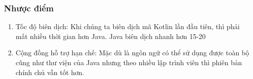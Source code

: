     \subsubsection{Nhược điểm}
        \begin{enumerate}
            \item Tốc độ biên dịch: Khi chúng ta biên dịch mã Kotlin lần đầu tiên, thì phải mất nhiều thời gian hơn Java. Java biên dịch nhanh hơn 15-20%
            \item Cộng đồng hỗ trợ hạn chế: Mặc dù là ngôn ngữ có thể sử dụng được toàn bộ cũng như thư viện của Java nhưng theo nhiều lập trình viên thì phiên bản chính chủ vẫn tốt hơn.  
        \end{enumerate}
